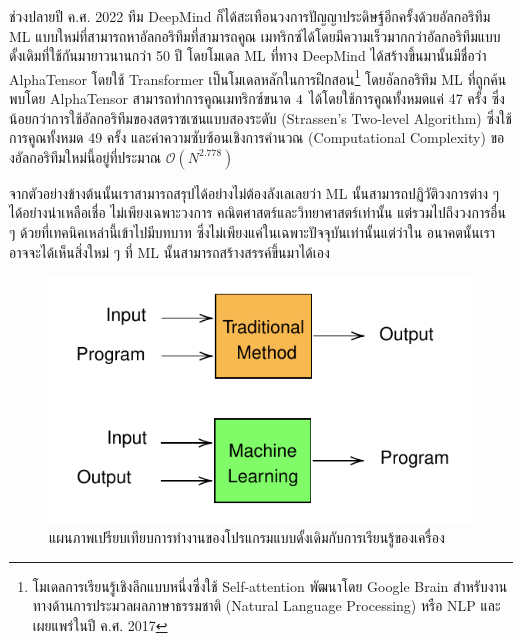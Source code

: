 ช่วงปลายปี ค.ศ. 2022 ทีม DeepMind ก็ได้สะเทือนวงการปัญญาประดิษฐ์อีกครั้งด้วยอัลกอริทึม ML แบบใหม่ที่สามารถหาอัลกอริทึมที่สามารถคูณ%
เมทริกซ์ได้โดยมีความเร็วมากกว่าอัลกอริทึมแบบดั้งเดิมที่ใช้กันมายาวนานกว่า 50 ปี โดยโมเดล ML ที่ทาง DeepMind ได้สร้างขึ้นมานั้นมีชื่อว่า 
AlphaTensor โดยใช้ Transformer\autocite{vaswani2017} เป็นโมเดลหลักในการฝึกสอน\footnote{โมเดลการเรียนรู้เชิงลึกแบบหนึ่งซึ่งใช้ 
Self-attention พัฒนาโดย Google Brain สำหรับงานทางด้านการประมวลผลภาษาธรรมชาติ (Natural Language Processing) หรือ 
NLP และเผยแพร่ในปี ค.ศ. 2017} โดยอัลกอริทึม ML ที่ถูกค้นพบโดย AlphaTensor สามารถทำการคูณเมทริกซ์ขนาด $4 \time 4$ 
ได้โดยใช้การคูณทั้งหมดแค่ 47 ครั้ง ซึ่งน้อยกว่าการใช้อัลกอริทึมของสตราซเซนแบบสองระดับ (Strassen's Two-level Algorithm) 
ซึ่งใช้การคูณทั้งหมด 49 ครั้ง\autocite{strassen1969}  และค่าความซับซ้อนเชิงการคำนวณ (Computational Complexity) 
ของอัลกอริทึมใหม่นี้อยู่ที่ประมาณ ${\mathcal{O}}({N}^{2.778})$ 

จากตัวอย่างข้างต้นนั้นเราสามารถสรุปได้อย่างไม่ต้องลังเลเลยว่า ML นั้นสามารถปฏิวัติวงการต่าง ๆ ได้อย่างน่าเหลือเชื่อ ไม่เพียงเฉพาะวงการ%
คณิตศาสตร์และวิทยาศาสตร์เท่านั้น แต่รวมไปถึงวงการอื่น ๆ ด้วยที่เทคนิคเหล่านี้เข้าไปมีบทบาท ซึ่งไม่เพียงแค่ในเฉพาะปัจจุบันเท่านั้นแต่ว่าใน%
อนาคตนั้นเราอาจจะได้เห็นสิ่งใหม่ ๆ ที่ ML นั้นสามารถสร้างสรรค์ขึ้นมาได้เอง

\begin{figure}[htbp]
    \centering
    \includegraphics[scale=1]{fig/ML-concept.pdf}
    \caption{แผนภาพเปรียบเทียบการทำงานของโปรแกรมแบบดั้งเดิมกับการเรียนรู้ของเครื่อง}
    \label{fig:ml_paradigm}
\end{figure}

